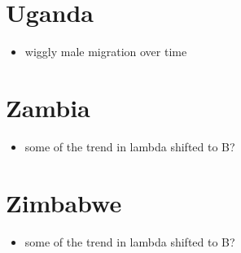 \documentclass[12pt,a4paper]{article}
\begin{document}
\section*{Uganda}
\begin{itemize}
\item wiggly male migration over time
\end{itemize}

\section*{Zambia}
\begin{itemize}
\item some of the trend in lambda shifted to B?
\end{itemize}

\section*{Zimbabwe}
\begin{itemize}
\item some of the trend in lambda shifted to B?
\end{itemize}
\end{document}
